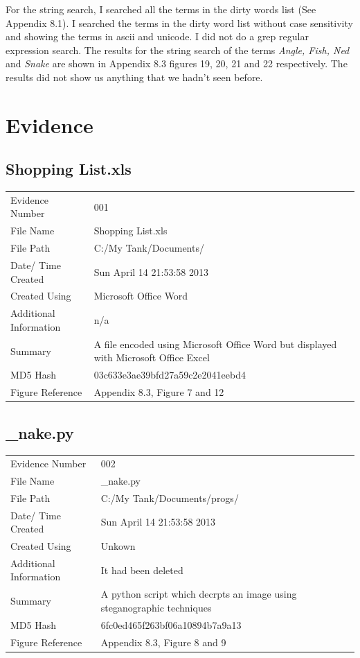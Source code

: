 \documentclass[12pt]{article}
\begin{document}
				For the string search, I searched all the terms in the dirty words list (See Appendix 8.1). I searched the terms in the dirty word list without case sensitivity and showing the terms in ascii and unicode. I did not do a grep regular expression search. The results for the string search of the terms \textit{Angle, Fish, Ned} and \textit{Snake} are shown in Appendix 8.3 figures 19, 20, 21 and 22 respectively. The results did not show us anything that we hadn't seen before. 

			\section{Evidence}
				\subsection{Shopping List.xls}	
					\begin{tabular}{ l | p{8cm} }
						Evidence Number & 001  \\
			    			File Name & Shopping List.xls  \\
			      			File Path & C:/My Tank/Documents/  \\
						Date/ Time Created & Sun April 14 21:53:58 2013\\
						Created Using & Microsoft Office Word\\
						Additional Information & n/a \\
						Summary & A file encoded using Microsoft Office Word but displayed with Microsoft Office Excel\\
						MD5 Hash & 03c633e3ae39bfd27a59c2e2041eebd4\\
						Figure Reference & Appendix 8.3, Figure 7 and 12\\
					\end{tabular}
				\subsection{\_nake.py}
					\begin{tabular}{l | p{8cm}}
						Evidence Number & 002  \\
			    			File Name & \_nake.py  \\
			      			File Path & C:/My Tank/Documents/progs/  \\
						Date/ Time Created & Sun April 14 21:53:58 2013\\
						Created Using & Unkown\\
						Additional Information & It had been deleted\\
						Summary & A python script which decrpts an image using steganographic techniques\\
						MD5 Hash & 6fc0ed465f263bf06a10894b7a9a13\\
						Figure Reference & Appendix 8.3, Figure 8 and 9\\
					\end{tabular}
\end{document}
